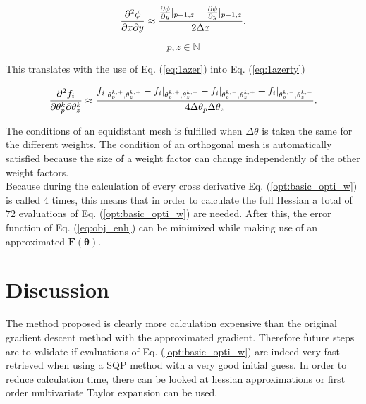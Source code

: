\begin{equation}\label{eq:book}
	\pdv{\phi}{x}{y} \approx \frac{\pdv{\phi}{y}|_{p+1,z} - \pdv{\phi}{y}|_{p-1,z}}{2 \Delta x}.
\end{equation}

\[p,z \in \mathbb{N}\]

This translates with the use of Eq. (\ref{eq:1azer}) into Eq. (\ref{eq:1azerty}) 

\begin{equation}\label{eq:1azerty}
\pdv{f_i}{\theta^{k}_p}{\theta^{k}_z} \approx \frac{f_i|_{\theta^{k,+}_p,\theta^{k,+}_z} - f_i|_{\theta^{k,+}_p,\theta^{k,-}_z} - f_i|_{\theta^{k,-}_p,\theta^{k,+}_z}+f_i|_{\theta^{k,-}_p,\theta^{k,-}_z}}{4\Delta \theta_p\Delta \theta_z}.
\end{equation}

The conditions of an equidistant mesh is fulfilled when $\Delta \theta$ is taken the same for the different weights. The condition of an orthogonal mesh is automatically satisfied because the size of a weight factor can change independently of the other weight factors.\\
Because during the calculation of every cross derivative Eq. (\ref{opt:basic_opti_w}) is called $4$ times, this means that in order to calculate the full Hessian a total of $72$ evaluations of Eq. (\ref{opt:basic_opti_w}) are needed. After this, the error function of Eq. (\ref{eq:obj_enh}) can be minimized while making use of an approximated $\bm{F(\bm{\theta})}$.


\section{Discussion} \label{s:discussion_enh}
The method proposed is clearly more calculation expensive than the original gradient descent method with the approximated gradient. Therefore future steps are to validate if evaluations of Eq. (\ref{opt:basic_opti_w}) are indeed very fast retrieved when using a SQP method with a very good initial guess. In order to reduce calculation time, there can be looked at hessian approximations or first order multivariate Taylor expansion can be used. 

